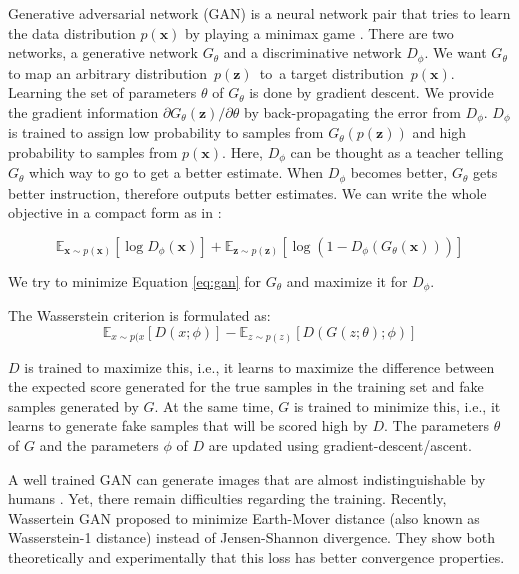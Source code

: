 \documentclass[a4paper,onesided,12pt]{report}
\begin{document}
Generative adversarial network (GAN) is a neural network pair that tries to learn the data distribution $p(\boldsymbol{x})$ by playing a minimax game \cite{gan}. There are two networks, a generative network $G_{\theta}$ and a discriminative network $D_{\phi}$. We want $G_{\theta}$ to map an arbitrary distribution~$p(\boldsymbol{z})$~to~a target distribution~$p(\boldsymbol{x})$. Learning the set of parameters $\theta$ of $G_{\theta}$ is done by gradient descent. We provide the gradient information $\partial{G_{\theta}(\boldsymbol{z})} / \partial{\theta}$ by back-propagating the error from $D_{\phi}$. $D_{\phi}$ is trained to assign low probability to samples from $G_{\theta}(p(\boldsymbol{z}))$ and high probability to samples from $p(\boldsymbol{x})$. Here, $D_{\phi}$ can be thought as a teacher telling $G_{\theta}$ which way to go to get a better estimate. When $D_{\phi}$ becomes better, $G_{\theta}$ gets better instruction, therefore outputs better estimates. We can write the whole objective in a compact form as in \cite{gan}:

\begin{equation}
\label{eq:gan}
\mathbb{E}_{\boldsymbol{x} \sim p(\boldsymbol{x})} [ \log{D_{\phi}(\boldsymbol{x})} ] + 
\mathbb{E}_{\boldsymbol{z} \sim p(\boldsymbol{z})} [ \log{(1-D_{\phi}(G_{\theta}(\boldsymbol{x})))} ]
\end{equation} 

We try to minimize Equation \ref{eq:gan} for $G_{\theta}$ and maximize it for $D_{\phi}$.

The Wasserstein criterion \cite{wgan} is formulated as:
\begin{equation}
\mathbb{E}_{x\sim p(x} [D(x;\phi)] - 
    \mathbb{E}_{z\sim p(z)} [D(G(z;\theta);\phi)]
\label{eq:wgan}
\end{equation}

$D$ is trained to maximize this, i.e., it learns to maximize the difference between the expected score generated for the true samples in the training set and fake samples generated by $G$. At the same time, $G$ is trained to minimize this, i.e., it learns to generate fake samples that will be scored high by $D$. The parameters $\theta$ of $G$ and the parameters $\phi$ of $D$ are updated using gradient-descent/ascent. 

A well trained GAN can generate images that are almost indistinguishable by humans \cite{biggan,proggan,stylegan}. Yet, there remain difficulties regarding the training. Recently, Wassertein GAN \cite{wgan} proposed to minimize Earth-Mover distance (also known as Wasserstein-1 distance) instead of Jensen-Shannon divergence. They show both theoretically and experimentally that this loss has better convergence properties.
\end{document}
